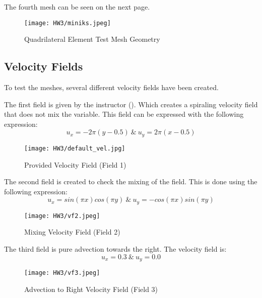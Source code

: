 \documentclass[a4paper, 12pt]{article}
\begin{document}
The fourth mesh can be seen on the next page.

\begin{figure}[H]
    \centering
    \texttt{[image: HW3/miniks.jpeg]}
    \caption{Quadrilateral Element Test Mesh Geometry}
\end{figure}\par

\subsection{Velocity Fields}
To test the meshes, several different velocity fields have been created. \\\par

The first field is given by the instructor (\cite{gi}). Which creates a spiraling velocity field that does not mix the variable. This field can be expressed with the following expression:
\begin{equation*}
    u_x = -2\pi(y-0.5)\: \& \: u_y = 2\pi(x-0.5)
\end{equation*}
\vspace{-1cm}
\begin{figure}[h]
    \centering
    \texttt{[image: HW3/default\_vel.jpg]}
    \caption{Provided Velocity Field (Field 1)}
    \label{f1}
\end{figure}\par

The second field is created to check the mixing of the field. This is done using the following expression:
\begin{equation*}
    u_x = sin(\pi x)cos(\pi y) \: \& \: u_y = -cos(\pi x)sin(\pi y)
\end{equation*}

\begin{figure}[h]
    \centering
    \texttt{[image: HW3/vf2.jpeg]}
    \caption{Mixing Velocity Field (Field 2)}
\end{figure}\par

The third field is pure advection towards the right. The velocity field is:
\begin{equation*}
    u_x = 0.3 \: \& \: u_y =0.0
\end{equation*}
\vspace{-1.5cm}
\begin{figure}[h]
    \centering
    \texttt{[image: HW3/vf3.jpeg]}
    \caption{Advection to Right Velocity Field (Field 3)}
\end{figure}\par
\end{document}
